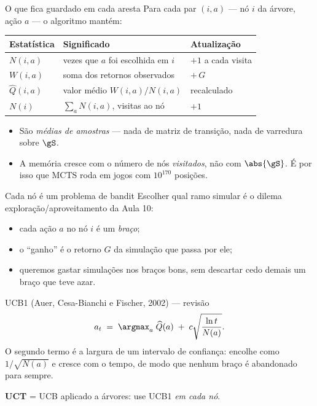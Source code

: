 \documentclass[aspectratio=169, 11pt]{beamer}
\newcommand{\Nv}[1]{N(#1)}                      %
\newcommand{\Qh}{\widehat{Q}}                   %
\newcommand{\ret}{G}                            %
\begin{document}
\begin{frame}{O que fica guardado em cada aresta}
  Para cada par $(i,a)$ --- nó $i$ da árvore, ação $a$ --- o algoritmo mantém:

  \vspace{0.4em}
  \centering
  \begin{tabular}{@{}lll@{}}
    \toprule
    \textbf{Estatística} & \textbf{Significado} & \textbf{Atualização} \\
    \midrule
    $\Nv{i,a}$ & vezes que $a$ foi escolhida em $i$ & $+1$ a cada visita \\
    $W(i,a)$   & soma dos retornos observados       & $+\,\ret$ \\
    $\Qh(i,a)$ & valor médio $W(i,a)/\Nv{i,a}$      & recalculado \\
    $\Nv{i}$   & $\sum_a \Nv{i,a}$, visitas ao nó   & $+1$ \\
    \bottomrule
  \end{tabular}

  \vfill
  \raggedright
  \begin{itemize}
    \item São \emph{médias de amostras} --- nada de matriz de transição, nada de
          varredura sobre $\gS$.
    \item A memória cresce com o número de nós \emph{visitados}, não com
          $\abs{\gS}$. É por isso que MCTS roda em jogos com $10^{170}$ posições.
  \end{itemize}
\end{frame}

\begin{frame}{Cada nó é um problema de bandit}
  Escolher qual ramo simular é o dilema exploração/aproveitamento da Aula 10:

  \begin{itemize}
    \item cada ação $a$ no nó $i$ é um \emph{braço};
    \item o ``ganho'' é o retorno $\ret$ da simulação que passa por ele;
    \item queremos gastar simulações nos braços bons, sem descartar cedo demais
          um braço que teve azar.
  \end{itemize}

  \pause
  \begin{teobox}{UCB1 (Auer, Cesa-Bianchi e Fischer, 2002) --- revisão}
    \[
      a_t \;=\; \argmax_{a}\; \Qh(a) \;+\; c\sqrt{\frac{\ln t}{N(a)}} .
    \]
    O segundo termo é a largura de um intervalo de confiança: encolhe como
    $1/\sqrt{N(a)}$ e cresce com o tempo, de modo que nenhum braço é abandonado
    para sempre.
  \end{teobox}

  \pause
  \textbf{UCT} = UCB aplicado a árvores: use UCB1 \emph{em cada nó}.
\end{frame}
\end{document}
